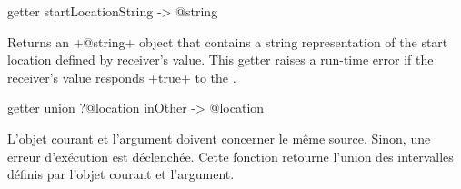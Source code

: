 
\begin{galgas4}
getter startLocationString -> @string
\end{galgas4}


Returns an \ggsq+@string+ object that contains a string representation of the start location defined by receiver's value. This getter raises a run-time error if the receiver's value responds \ggsq+true+ to the .



\begin{galgas4}
getter union ?@location inOther -> @location
\end{galgas4}

L'objet courant et l'argument doivent concerner le même source. Sinon, une erreur d'exécution est déclenchée. Cette fonction retourne l'union des intervalles définis par l'objet courant et l'argument.

